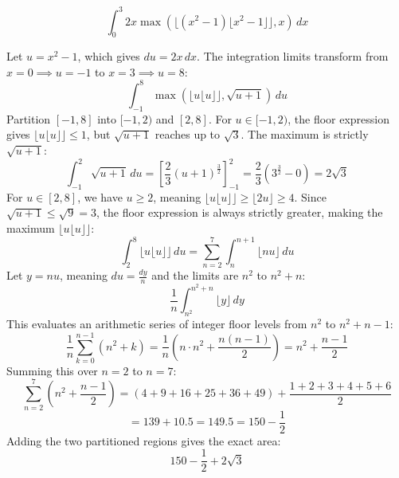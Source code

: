 \begin{questions}
    \question \[ \int_0^3 2x \max \left( \lfloor (x^2 - 1)\lfloor x^2 - 1 \rfloor \rfloor, x \right) \,dx \]
    \begin{solution}
        Let $u = x^2 - 1$, which gives $du = 2x \,dx$. The integration limits transform from $x=0 \implies u=-1$ to $x=3 \implies u=8$:
        \[ \int_{-1}^8 \max \left( \lfloor u\lfloor u \rfloor \rfloor, \sqrt{u+1} \right) \,du \]
        Partition $[-1, 8]$ into $[-1, 2)$ and $[2, 8]$. For $u \in [-1, 2)$, the floor expression gives $\lfloor u\lfloor u \rfloor \rfloor \le 1$, but $\sqrt{u+1}$ reaches up to $\sqrt{3}$. The maximum is strictly $\sqrt{u+1}$:
        \[ \int_{-1}^2 \sqrt{u+1} \,du = \left[ \frac{2}{3}(u+1)^{\frac{3}{2}} \right]_{-1}^2 = \frac{2}{3} \left( 3^{\frac{3}{2}} - 0 \right) = 2\sqrt{3} \]
        For $u \in [2, 8]$, we have $u \ge 2$, meaning $\lfloor u\lfloor u \rfloor \rfloor \ge \lfloor 2u \rfloor \ge 4$. Since $\sqrt{u+1} \le \sqrt{9} = 3$, the floor expression is always strictly greater, making the maximum $\lfloor u\lfloor u \rfloor \rfloor$:
        \[ \int_2^8 \lfloor u\lfloor u \rfloor \rfloor \,du = \sum_{n=2}^7 \int_n^{n+1} \lfloor nu \rfloor \,du \]
        Let $y = nu$, meaning $du = \frac{dy}{n}$ and the limits are $n^2$ to $n^2+n$:
        \[ \frac{1}{n} \int_{n^2}^{n^2+n} \lfloor y \rfloor \,dy \]
        This evaluates an arithmetic series of integer floor levels from $n^2$ to $n^2+n-1$:
        \[ \frac{1}{n} \sum_{k=0}^{n-1} (n^2 + k) = \frac{1}{n} \left( n \cdot n^2 + \frac{n(n-1)}{2} \right) = n^2 + \frac{n-1}{2} \]
        Summing this over $n=2$ to $n=7$:
        \[ \sum_{n=2}^7 \left( n^2 + \frac{n-1}{2} \right) = (4 + 9 + 16 + 25 + 36 + 49) + \frac{1 + 2 + 3 + 4 + 5 + 6}{2} \]
        \[ = 139 + 10.5 = 149.5 = 150 - \frac{1}{2} \]
        Adding the two partitioned regions gives the exact area:
        \[ 150 - \frac{1}{2} + 2\sqrt{3} \]
    \end{solution}
\end{questions}

